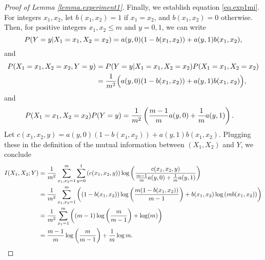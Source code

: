 \begin{proof}[Proof of Lemma \ref{lemma.experiment1}]
	Finally, we establish equation \eqref{eq.exp1mi}.
	For integers $x_1, x_2$, 
	let 
	$b(x_1, x_2) = 1$ if $x_1 = x_2$,
	and $b(x_1, x_2) = 0$ otherwise.
	Then, 
	for positive integers $x_1, x_2 \leq m$ and $y=0, 1$,
	we can write
	\begin{equation*}
		\Prob(Y=y \vert X_1 = x_1, X_2 = x_2)
		=
		a(y, 0)( 1 - b(x_1, x_2) )
		+
		a(y, 1) b(x_1, x_2),
	\end{equation*}
	and
	\begin{equation*}
		\begin{split}
		\Prob(X_1 = x_1, X_2 = x_2, Y = y)
			&=
		\Prob(Y=y \vert X_1 = x_1, X_2 = x_2)
		\Prob(X_1 = x_1, X_2 = x_2)
		\\
			&=
		\frac{1}{m\squared}
		\Big(
		a(y, 0)( 1 - b(x_1, x_2))
		+
		a(y, 1) b(x_1, x_2)
		\Big),
		\end{split}
	\end{equation*}
	and
	\begin{equation*}
		\begin{split}
			\Prob(X_1 = x_1, X_2 = x_2) \Prob(Y = y)
			&=
			\frac{1}{m\squared}
			\left(
			\frac{m-1}{m} a(y, 0)
			+
			\frac{1}{m} a(y, 1)
			\right).
		\end{split}
	\end{equation*}
	Let 
	$c(x_1, x_2, y) = 
			a(y, 0)( 1 - b(x_1, x_2) )
			+
			a(y, 1) b(x_1, x_2)
			$.
	Plugging these in the definition of the mutual information between $(X_1, X_2)$ and $Y$,
	we conclude
	\begin{equation*}
		\begin{split}
			I(X_1, X_2; Y)
			& =
			\frac{1}{m\squared}
			\sum_{x_1, x_2 = 1}^{m}
			\sum_{y=0}^{1}
			\left(
			c(x_1, x_2, y)
			\right)
			\log
			\left(
			\frac
			{
			c(x_1, x_2, y)
			}
			{
				\frac{m-1}{m} a(y, 0) + \frac{1}{m} a(y, 1)
			}
			\right)
			\\
			& = 
			\frac{1}{m\squared}
			\sum_{x_1, x_2 = 1}^{m}
			\left(
			(1 - b(x_1, x_2))
			\log
			\left(
			\frac{m(1-b(x_1, x_2))}{m-1}
			\right)
			+
			b(x_1, x_2)
			\log
			\left(
			m b(x_1, x_2)
			\right)
			\right)
			\\
			& =
			\frac{1}{m\squared}
			\sum_{x_1 = 1}^{m}
			\left(
			(m-1)\log\left(\frac{m}{m-1}\right) + \log(m)
			\right)
			\\
			& =
			\frac{m-1}{m} \log\left(\frac{m}{m-1}\right)
			+
			\frac{1}{m}\log m
			.
		\end{split}
	\end{equation*}

\end{proof}
